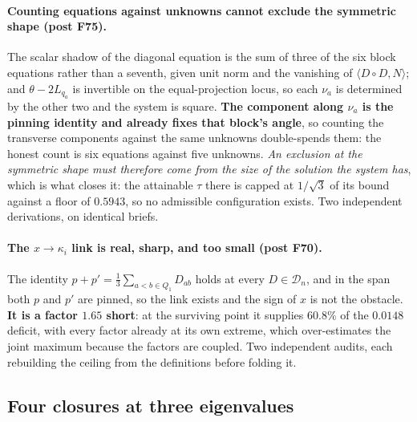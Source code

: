 \paragraph{Counting equations against unknowns cannot exclude the symmetric shape (post F75).} The scalar shadow of the diagonal equation is the sum of three of the six block equations rather than a seventh, given unit norm and the vanishing of $\langle D\circ D,N\rangle$; and $\theta-2L_{q_a}$ is invertible on the equal-projection locus, so each $\nu_a$ is determined by the other two and the system is square. \textbf{The component along $\nu_a$ is the pinning identity and already fixes that block's angle}, so counting the transverse components against the same unknowns double-spends them: the honest count is six equations against five unknowns. \emph{An exclusion at the symmetric shape must therefore come from the size of the solution the system has}, which is what closes it: the attainable $\tau$ there is capped at $1/\sqrt3$ of its bound against a floor of $0.5943$, so no admissible configuration exists. Two independent derivations, on identical briefs.

\paragraph{The $x\to\kappa_i$ link is real, sharp, and too small (post F70).} The identity $p+p'=\tfrac13\sum_{a<b\in Q_1}D_{ab}$ holds at every $D\in\mathcal D_n$, and in the span both $p$ and $p'$ are pinned, so the link exists and the sign of $x$ is not the obstacle. \textbf{It is a factor $1.65$ short}: at the surviving point it supplies $60.8\%$ of the $0.0148$ deficit, with every factor already at its own extreme, which over-estimates the joint maximum because the factors are coupled. Two independent audits, each rebuilding the ceiling from the definitions before folding it.

\subsection{Four closures at three eigenvalues}\label{sec:pairfences}

